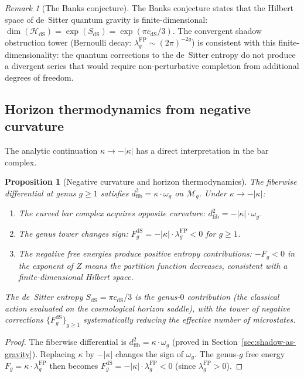 \documentclass[11pt,reqno]{amsart}
\newtheorem{proposition}[theorem]{Proposition}
\theoremstyle{definition}
\theoremstyle{remark}
\newtheorem{remark}[theorem]{Remark}
\begin{document}
\begin{remark}[The Banks conjecture]
\label{rem:banks}
The Banks conjecture states that the Hilbert space of de~Sitter
quantum gravity is finite-dimensional:
$\dim(\mathcal{H}_{\mathrm{dS}})
= \exp(S_{\mathrm{dS}})
= \exp(\pi c_{\mathrm{dS}}/3)$.
The convergent shadow obstruction tower (Bernoulli decay:
$\lambda_g^{\mathrm{FP}} \sim (2\pi)^{-2g}$) is consistent with
this finite-dimensionality: the quantum corrections to the
de~Sitter entropy do not produce a divergent series that would
require non-perturbative completion from additional degrees of
freedom.
\end{remark}

\subsection{Horizon thermodynamics from negative curvature}

The analytic continuation $\kappa \to -|\kappa|$ has a direct
interpretation in the bar complex.

\begin{proposition}[Negative curvature and horizon thermodynamics]
\label{prop:negative-kappa}
The fiberwise differential at genus $g \ge 1$ satisfies
$d_{\mathrm{fib}}^2 = \kappa \cdot \omega_g$ on
$\overline{\mathcal{M}}_g$. Under
$\kappa \to -|\kappa|$:
\begin{enumerate}[label=\textup{(\roman*)}]
\item The curved bar complex acquires \emph{opposite} curvature:
  $d_{\mathrm{fib}}^2 = -|\kappa| \cdot \omega_g$.
\item The genus tower changes sign:
  $F_g^{\mathrm{dS}} = -|\kappa| \cdot \lambda_g^{\mathrm{FP}}
  < 0$ for $g \ge 1$.
\item The negative free energies produce \emph{positive} entropy
  contributions: $-F_g < 0$ in the exponent of $Z$ means the
  partition function decreases, consistent with a finite-dimensional
  Hilbert space.
\end{enumerate}
The de~Sitter entropy $S_{\mathrm{dS}} = \pi c_{\mathrm{dS}}/3$
is the genus-$0$ contribution (the classical action evaluated on
the cosmological horizon saddle), with the tower of negative
corrections $\{F_g^{\mathrm{dS}}\}_{g \ge 1}$ systematically
reducing the effective number of microstates.
\end{proposition}

\begin{proof}
The fiberwise differential is $d_{\mathrm{fib}}^2
= \kappa \cdot \omega_g$ (proved in Section~\ref{sec:shadow-as-gravity}).
Replacing $\kappa$ by $-|\kappa|$ changes the sign of $\omega_g$.
The genus-$g$ free energy $F_g = \kappa \cdot
\lambda_g^{\mathrm{FP}}$ then becomes
$F_g^{\mathrm{dS}} = -|\kappa| \cdot \lambda_g^{\mathrm{FP}} < 0$
(since $\lambda_g^{\mathrm{FP}} > 0$).
\end{proof}
\end{document}
